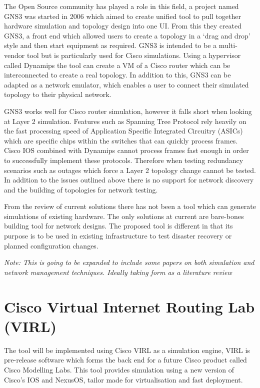 \documentclass[11pt]{report}
\begin{document}
The Open Source community has played a role in this field, a project named GNS3 was started in 2006 which aimed to create  unified tool to pull together hardware simulation and topology design into one UI. From this they created GNS3, a front end which allowed users to create a topology in a ‘drag and drop’ style and then start equipment as required. GNS3 is intended to be a multi-vendor tool but is particularly used for Cisco simulations. Using a hypervisor called Dynamips the tool can create a VM of a Cisco router which can be interconnected to create a real topology. In addition to this, GNS3 can be adapted as a network emulator, which enables a user to connect their simulated topology to their physical network.

GNS3 works well for Cisco router simulation, however it falls short when looking at Layer 2 simulation. Features such as Spanning Tree Protocol rely heavily on the fast processing speed of Application Specific Integrated Circuitry (ASICs) which are specific chips within the switches that can quickly process frames. Cisco IOS combined with Dynamips cannot process frames fast enough in order to successfully implement these protocols. Therefore when testing redundancy scenarios such as outages which force a Layer 2 topology change cannot be tested. In addition to the issues outlined above there is no support for network discovery and the building of topologies for network testing.

From the review of current solutions there has not been a tool which can generate simulations of existing hardware. The only solutions at current are bare-bones building tool for network designs. The proposed tool is different in that its purpose is to be used in existing infrastructure to test disaster recovery or planned configuration changes.

\textit{Note: This is going to be expanded to include some papers on both simulation and network management techniques. Ideally taking form as a literature review}

\section{Cisco Virtual Internet Routing Lab (VIRL)}

The tool will be implemented using Cisco VIRL as a simulation engine, VIRL is pre-release software which forms the back end for a future Cisco product called Cisco Modelling Labs. This tool provides simulation using a new version of Cisco’s IOS and NexusOS, tailor made for virtualisation and fast deployment.
\end{document}
